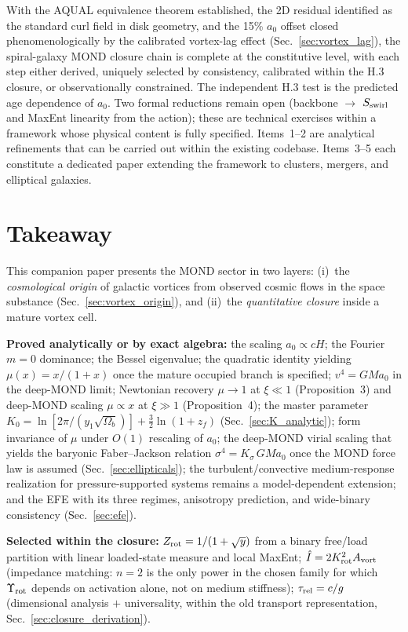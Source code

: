 \documentclass[11pt]{article}
\begin{document}
\noindent With the AQUAL equivalence theorem established, the
2D residual identified as the standard curl field in disk geometry,
and the 15\% $a_0$ offset closed phenomenologically by the calibrated
vortex-lag effect
(Sec.~\ref{sec:vortex_lag}),
the spiral-galaxy MOND closure chain is complete at the
constitutive level, with each step either derived, uniquely
selected by consistency, calibrated within the H.3 closure, or
observationally constrained.  The independent H.3 test is the predicted
age dependence of $a_0$.
Two formal reductions remain open (backbone $\to$ $S_{\rm swirl}$
and MaxEnt linearity from the action); these are technical
exercises within a framework whose physical content is fully
specified.
Items~1--2 are analytical refinements that can be carried out
within the existing codebase.
Items~3--5 each constitute a dedicated paper extending the
framework to clusters, mergers, and elliptical galaxies.

{}
\section*{Takeaway}
This companion paper presents the MOND sector in two layers: (i)~the
\emph{cosmological origin} of galactic vortices from observed cosmic
flows in the space substance (Sec.~\ref{sec:vortex_origin}), and
(ii)~the \emph{quantitative closure} inside a mature vortex cell.

\textbf{Proved analytically or by exact algebra:} the scaling
$a_0\propto cH$; the Fourier $m=0$ dominance; the Bessel
eigenvalue; the quadratic identity yielding
$\mu(x)=x/(1+x)$ once the mature occupied branch is specified;
$v^4=GMa_0$ in the deep-MOND limit; Newtonian recovery
$\mu\to 1$ at $\xi \ll 1$ (Proposition~3) and deep-MOND
scaling $\mu\propto x$ at $\xi \gg 1$ (Proposition~4);
the master parameter
$K_0=\ln[2\pi/(y_1\sqrt{\Omega_b})]+\frac32\ln(1+z_f)$
(Sec.~\ref{sec:K_analytic}); form invariance of $\mu$
under $O(1)$ rescaling of $a_0$; the deep-MOND virial
scaling that yields the baryonic Faber--Jackson relation
$\sigma^4 = K_\sigma\,GMa_0$ once the MOND force law is
assumed (Sec.~\ref{sec:ellipticals}); the turbulent/convective
medium-response realization for pressure-supported systems remains
a model-dependent extension; and the EFE with its
three regimes, anisotropy prediction, and wide-binary
consistency (Sec.~\ref{sec:efe}).

\textbf{Selected within the closure:}
$Z_{\rm rot}=1/(1+\sqrt{y})$ from a binary free/load partition with
linear loaded-state measure and local MaxEnt;
$\hat I=2K_{\rm rot}^2A_{\rm vort}$ (impedance matching:
$n=2$ is the only power in the chosen family for which
$\Upsilon_{\rm rot}$ depends on activation alone, not on medium
stiffness);
$\tau_{\rm rel}=c/g$ (dimensional analysis $+$ universality,
within the old transport representation,
Sec.~\ref{sec:closure_derivation}).
\end{document}
